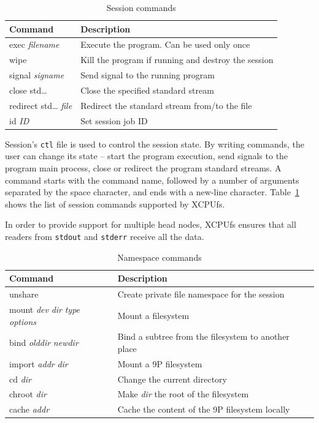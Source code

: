 \documentclass[10pt,conference,letterpaper]{IEEEtran}
\begin{document}
\begin{table}[ht]
\begin{center}
\begin{tabular}{lp{1.9in}}
    Command & Description\\
    \hline
    exec \textsl{filename} & Execute the program. Can be used only once\\
    wipe & Kill the program if running and destroy the session\\
    signal \textsl{signame} & Send signal to the running program\\
    close std{\ldots} & Close the specified standard stream\\
    redirect std{\ldots} \textsl{file} & Redirect the standard stream from/to the file\\
    id \textsl{ID} & Set session job ID\\
\end{tabular}
\caption{Session commands}
\label{tbl:XCPU2-sctl}
\end{center}
\end{table}

Session's \texttt{ctl} file is used to control the session state. By writing
commands, the user can change its state -- start the program execution, send
signals to the program main process, close or redirect the program standard
streams. A command starts with the command name, followed by a number of
arguments separated by the space character, and ends with a new-line
character. Table~\ref{tbl:XCPU2-sctl} shows the list of session commands
supported by XCPUfs.

In order to provide support for multiple head nodes, XCPUfs ensures that all
readers from \texttt{stdout} and \texttt{stderr} receive all the data. 

\begin{table}[ht]
\begin{center}
\begin{tabular}{lp{1.9in}}
    Command & Description\\
    \hline
    unshare & Create private file namespace for the session\\
    mount \textsl{dev} \textsl{dir} \textsl{type} \textsl{options} & Mount a filesystem\\
    bind \textsl{olddir} \textsl{newdir} & Bind a subtree from the filesystem to another place \\
    import \textsl{addr} \textsl{dir} & Mount a 9P filesystem\\
    cd \textsl{dir} & Change the current directory\\
    chroot \textsl{dir} & Make \textsl{dir} the root of the filesystem\\
    cache \textsl{addr} & Cache the content of the 9P filesystem locally\\
\end{tabular}
\caption{Namespace commands}
\label{tbl:XCPU2-ns}
\end{center}
\end{table}
\end{document}
